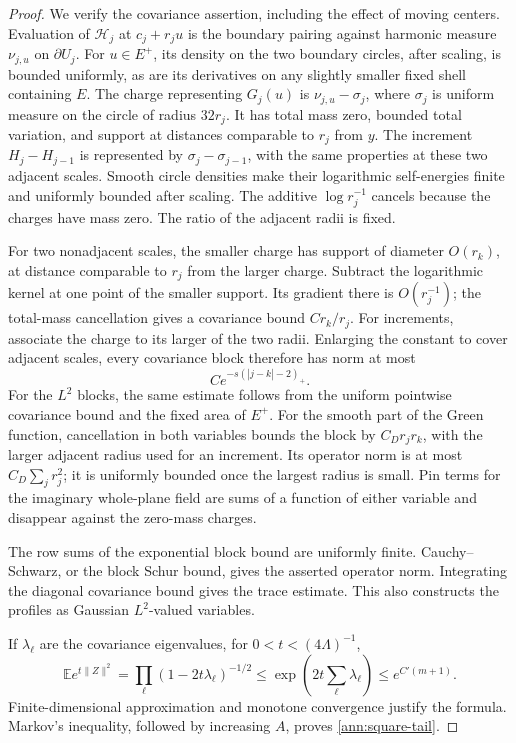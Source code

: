 \documentclass[11pt]{article}
\numberwithin{equation}{section}
\theoremstyle{definition}
\theoremstyle{remark}
\newcommand{\1}{\mathbf 1}
\begin{document}
\begin{proof}
We verify the covariance assertion, including the effect of moving
centers.  Evaluation of \(\mathcal H_j\) at \(c_j+r_ju\)
is the boundary pairing against harmonic measure
\(\nu_{j,u}\) on \(\partial U_j\).  For \(u\in E^+\), its
density on the two boundary circles, after scaling, is bounded
uniformly, as are its derivatives on any slightly smaller fixed
shell containing \(E\).  The charge representing \(G_j(u)\)
is \(\nu_{j,u}-\sigma_j\), where \(\sigma_j\) is uniform measure
on the circle of radius \(32r_j\).  It has total mass zero,
bounded total variation, and support at distances comparable to
\(r_j\) from \(y\).  The increment \(H_j-H_{j-1}\) is represented
by \(\sigma_j-\sigma_{j-1}\), with the same properties at these
two adjacent scales.  Smooth circle densities make their logarithmic
self-energies finite and uniformly bounded after scaling.  The
additive \(\log r_j^{-1}\) cancels because the charges have mass
zero.  The ratio of the adjacent radii is fixed.

For two nonadjacent scales, the smaller charge has support of
diameter \(O(r_k)\), at distance comparable to \(r_j\) from
the larger charge.  Subtract the logarithmic kernel at one point
of the smaller support.  Its gradient there is \(O(r_j^{-1})\);
the total-mass cancellation gives a covariance bound
\(C r_k/r_j\).  For increments, associate the charge to its
larger of the two radii.  Enlarging the constant to cover adjacent
scales, every covariance block therefore has norm at most
\[
 C e^{-s(|j-k|-2)_+}.
\]
For the \(L^2\) blocks, the same estimate follows from the uniform
pointwise covariance bound and the fixed area of \(E^+\).
For the smooth part of the Green function, cancellation in both
variables bounds the block by \(C_Dr_jr_k\), with the larger
adjacent radius used for an increment.  Its operator norm is at
most \(C_D\sum_jr_j^2\); it is uniformly bounded once the largest
radius is small.  Pin terms for the imaginary whole-plane field
are sums of a function of either variable and disappear against
the zero-mass charges.

The row sums of the exponential block bound are uniformly finite.
Cauchy--Schwarz, or the block Schur bound, gives the asserted operator
norm.  Integrating the diagonal covariance bound gives the trace
estimate.  This also constructs the profiles as Gaussian
\(L^2\)-valued variables.

If \(\lambda_\ell\) are the covariance eigenvalues, for
\(0<t<(4\Lambda)^{-1}\),
\[
 \mathbb E e^{t\|Z\|^2}
 =\prod_\ell(1-2t\lambda_\ell)^{-1/2}
 \le \exp\!\left(2t\sum_\ell\lambda_\ell\right)
 \le e^{C'(m+1)}.
\]
Finite-dimensional approximation and monotone convergence justify
the formula.  Markov's inequality, followed by increasing \(A\),
proves \eqref{ann:square-tail}.
\end{proof}
\end{document}
